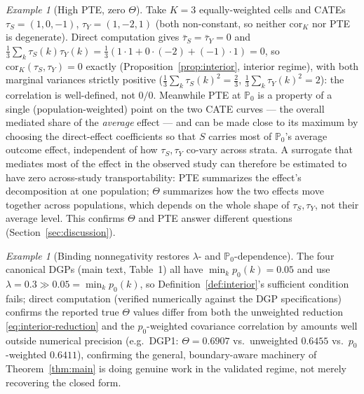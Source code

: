 \documentclass[11pt]{article}
\theoremstyle{plain}
\theoremstyle{definition}
\theoremstyle{remark}
\newtheorem{example}[theorem]{Example}
\newcommand{\PP}{\mathbb{P}}
\newcommand{\Corr}{\mathrm{cor}}
\begin{document}
\begin{example}[High PTE, zero $\Theta$]\label{ex:pte-high-theta-zero}
Take $K=3$ equally-weighted cells and CATEs $\tau_S=(1,0,-1)$, $\tau_Y=(1,-2,1)$ (both
non-constant, so neither $\Corr_K$ nor PTE is degenerate). Direct computation gives
$\bar\tau_S=\bar\tau_Y=0$ and $\frac13\sum_k\tau_S(k)\tau_Y(k)=\frac13(1\cdot1+0\cdot(-2)+(-1)\cdot1)=0$,
so $\Corr_K(\tau_S,\tau_Y)=0$ exactly (Proposition~\ref{prop:interior}, interior
regime), with both marginal variances strictly positive
($\frac13\sum_k\tau_S(k)^2=\frac23$, $\frac13\sum_k\tau_Y(k)^2=2$): the correlation is
well-defined, not $0/0$. Meanwhile PTE at $\PP_0$ is a property of a single
(population-weighted) point on the two CATE curves --- the overall mediated share of
the \emph{average} effect --- and can be made close to its maximum by choosing the
direct-effect coefficients so that $S$ carries most of $\PP_0$'s average outcome
effect, independent of how $\tau_S,\tau_Y$ co-vary across strata. A surrogate that
mediates most of the effect in the observed study can therefore be estimated to have
zero across-study transportability: PTE summarizes the effect's decomposition at one
population; $\Theta$ summarizes how the two effects move together across populations,
which depends on the whole shape of $\tau_S,\tau_Y$, not their average level. This
confirms $\Theta$ and PTE answer different questions (Section~\ref{sec:discussion}).
\end{example}

\begin{example}[Binding nonnegativity restores $\lambda$- and $\PP_0$-dependence]\label{ex:binding}
The four canonical DGPs (main text, Table~1) all have $\min_kp_0(k)=0.05$ and use
$\lambda=0.3\gg0.05=\min_kp_0(k)$, so Definition~\ref{def:interior}'s sufficient
condition fails; direct computation (verified numerically against the DGP
specifications) confirms the reported true $\Theta$ values differ from both the
unweighted reduction \eqref{eq:interior-reduction} and the $p_0$-weighted covariance
correlation by amounts well outside numerical precision (e.g.\ DGP1:
$\Theta=0.6907$ vs.\ unweighted $0.6455$ vs.\ $p_0$-weighted $0.6411$), confirming the
general, boundary-aware machinery of Theorem~\ref{thm:main} is doing genuine work in
the validated regime, not merely recovering the closed form.
\end{example}
\end{document}
